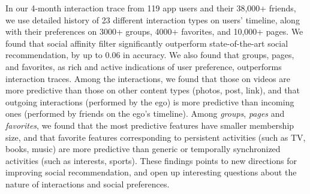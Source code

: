 In our 4-month interaction trace from 119 app users and their 38,000+ friends, 
we use detailed history of 23 different interaction types on users' timeline, 
along with their preferences on 3000+ groups, 4000+ favorites, and 10,000+ pages. 
We found that social affinity filter significantly 
outperform state-of-the-art social recommendation, by up to 0.06 in accuracy.
We also found that groups, pages, and favorites, 
as rich and active indications of user preference, outperforms interaction traces. 
Among the interactions, we found that those on videos are more predictive than those on other content types (photos, post, link), and that outgoing interactions (performed by the ego) 
is more predictive than incoming ones (performed by friends on the ego's timeline).
Among {\em groups}, {\em pages} and {\em favorites}, we found that the most  
predictive features have smaller membership size, and that favorite features corresponding to 
persistent activities (such as TV, books, music) are more predictive than generic or 
temporally synchronized activities (such as interests, sports). 
These findings points to new directions for improving social recommendation, 
and open up interesting questions about the nature of interactions and social preferences. 



